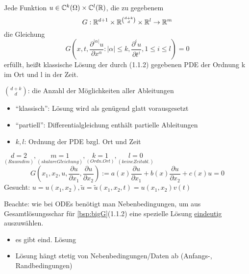 \begin{definition}%
    Jede Funktion $u\in\mathbb{C}^k(\Omega)\times\mathbb{C}^l(\mathbb{R})$, die zu gegebenem 
    \[
        G: \mathbb{R}^{d+1}\times \mathbb{R}^{d+k \choose d}\times\mathbb{R}^l \to \mathbb{R}^m
    \]
     die Gleichung 
     \begin{equation}%
         G\left(x,t, \frac{\partial^{|\alpha|}u}{\partial x^\alpha}: |\alpha| \leq k, \frac{\partial^i u}{\partial t^i}, 1\leq i\leq l\right) = 0
         \label{eq:bigG}
     \end{equation}
     erfüllt, heißt klassische Lösung der durch (1.1.2) gegebenen PDE der Ordnung k im Ort und l in der Zeit.
\end{definition}

$d+k \choose d$: die Anzahl der Möglichkeiten aller Ableitungen

\begin{itemize}
    \item ``klassisch'': Lösung wird als genügend glatt vorausgesetzt
    \item ``partiell'': Differentialgleichung enthält partielle Ableitungen
    \item $k,l$: Ordnung der PDE bzgl. Ort und Zeit
\end{itemize}

\begin{beispiel}
    $\underset{(Raumdim)}{d=2}, \underset{(skalare Gleichung)}{m=1}, \underset{(Ordn. Ort)}{k=1}, \underset{(keine Zeitabl.)}{l=0}$
    \[
        G\left( x_1,x_2,u,\frac{\partial u}{\partial x_1}, \frac{\partial u}{\partial x_2} \right) := a(x) \frac{\partial u}{\partial x_1} + b(x) \frac{ \partial u}{\partial x_2} + c(x) u = 0
    \]
    Gesucht: $u=u(x_1,x_2), \tilde u = \tilde u(x_1,x_2,t) = u(x_1,x_2)v(t)$
    \label{bsp:bigG}
\end{beispiel}

Beachte: wie bei ODEs benötigt man Nebenbedingungen, um aus Gesamtlösungsschar für \ref{bsp:bigG}(1.1.2) eine spezielle Lösung \underline{eindeutig} auszuwählen.

\begin{definition}
\begin{itemize}
    \item es gibt eind. Lösung
    \item Lösung hängt stetig von Nebenbedingungen/Daten ab (Anfangs-, Randbedingungen)
\end{itemize}
\end{definition}

